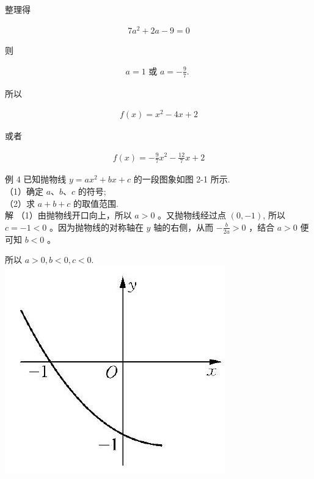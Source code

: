 \documentclass[10pt]{article}
\begin{document}
整理得

\begin{align*}
7 a^{2}+2 a-9=0
\end{align*}

则

\begin{align*}
a=1 \text { 或 } a=-\frac{9}{7} \text {. }
\end{align*}

所以

\begin{align*}
f(x)=x^{2}-4 x+2
\end{align*}

或者

\begin{align*}
f(x)=-\frac{9}{7} x^{2}-\frac{12}{7} x+2
\end{align*}

例 4 已知抛物线 $y=a x^{2}+b x+c$ 的一段图象如图 2-1 所示.\\
（1）确定 $a 、 b 、 c$ 的符号;\\
（2）求 $a+b+c$ 的取值范围.\\
解 （1）由抛物线开口向上，所以 $a>0$ 。又抛物线经过点 $(0,-1)$, 所以 $c=-1<0$ 。因为抛物线的对称轴在 $y$ 轴的右侧，从而 $-\frac{b}{2 a}>0$ ，结合 $a>0$ 便可知 $b<0$ 。

所以 $a>0, b<0, c<0$.\\
\includegraphics[max width=\textwidth, center]{2024_10_30_1bf34f7aeb61f11d11d3g-029}
\end{document}

